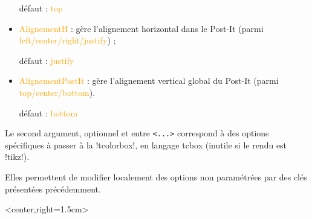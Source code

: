 \documentclass[french,a4paper,11pt]{article}
\newcommand\Cle[1]{{\small\sffamily\textlangle \textcolor{orange}{#1}\textrangle}}
\begin{document}
\begin{tipblock}
\begin{itemize}
	\hfill{}défaut : \Cle{top}
	\item \Cle{AlignementH} : gère l'alignement horizontal dans le Post-It (parmi \Cle{left/center/right/justify}) ;
	
	\hfill{}défaut : \Cle{justify}
	\item \Cle{AlignementPostIt} : gère l'alignement vertical global du Post-It (parmi \Cle{top/center/bottom}).
	
	\hfill{}défaut : \Cle{bottom}
\end{itemize}
\vspace*{-\baselineskip}\leavevmode
\end{tipblock}

\begin{tipblock}
Le second argument, optionnel et entre \texttt{<...>} correspond à des options spécifiques à passer à la \motcletex!tcolorbox!, en langage \textsf{tcbox} (inutile si le rendu est \motcletex!tikz!).

Elles permettent de modifier localement des options non paramétrées par des clés présentées précédemment.
\end{tipblock}

\begin{DemoCode}[]
\begin{PostIt}%
	[Couleur=cyan,Attache=Trombone,Largeur=10cm,Inclinaison=10]<center,right=1.5cm>
\lipsum[1][1-3]
\end{PostIt}
\end{DemoCode}

\begin{DemoCode}[]
\hfill\begin{PostIt}%
	[Rendu=tikz,Couleur=violet,Largeur=9cm,Inclinaison=-10,Attache=Trombone,
	CouleurAttache=black,ExtraMargeDroite=1cm,Titre={Petit Titre},
	PoliceTitre={\color{white}\bfseries\small\sffamily}]
\lipsum[1][1-3]
\end{PostIt}\hfill~
\end{DemoCode}

\begin{DemoCode}[]
\hfill\begin{PostIt}%
	[Rendu=tikzv2,Couleur=orange,Largeur=9cm,Inclinaison=-10,Attache=Scotch, 	Titre={Essai},
	PoliceTitre={\color{blue!50!black}\bfseries\itshape\small\ttfamily}]
\lipsum[1][1-3]
\end{PostIt}\hfill~
\end{DemoCode}

\pagebreak
\end{document}
